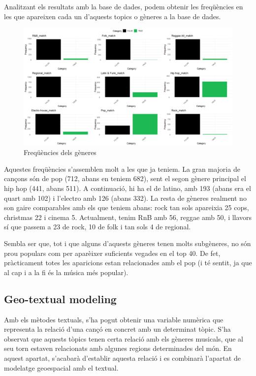 Analitzant els resultats amb la base de dades, podem obtenir les freqüències en les que apareixen cada un d'aquests topics o gèneres a la base de dades.
\begin{figure}[H]
    \centering
    \includegraphics[width=0.7\linewidth]{Images//8_Textual//Genres/genres_frequencies.png}
    \caption{Freqüències dels gèneres}
    \label{fig:textual_genre_freq}
\end{figure}

Aquestes freqüències s'assemblen molt a les que ja teniem. La gran majoria de cançons són de pop (712, abans en teniem 682), sent el segon gènere principal el hip hop (441, abans 511). A continuació, hi ha el de latino, amb 193 (abans era el quart amb 102) i l'electro amb 126 (abans 332). La resta de gèneres realment no son gaire comparables amb els que teniem abans: rock tan sols apareixia 25 cops, christmas 22 i cinema 5. Actualment, tenim RnB amb 56, reggae amb 50, i llavors sí que passem a 23 de rock, 10 de folk i tan sols 4 de regional.

Sembla ser que, tot i que alguns d'aquests gèneres tenen molts subgèneres, no són prou populars com per aparèixer suficients vegades en el top 40. De fet, pràcticament totes les aparicions estan relacionades amb el pop (i té sentit, ja que al cap i a la fi és la música més popular).


\subsection{Geo-textual modeling}

Amb els mètodes textuals, s'ha pogut obtenir una variable numèrica que representa la relació d'una cançó en concret amb un determinat tòpic. S'ha observat que aquests tòpics tenen certa relació amb els gèneres musicals, que al seu torn estaven relacionats amb algunes regions determinades del món. En aquest apartat, s'acabarà d'establir aquesta relació i es combinarà l'apartat de modelatge geoespacial amb el textual.

